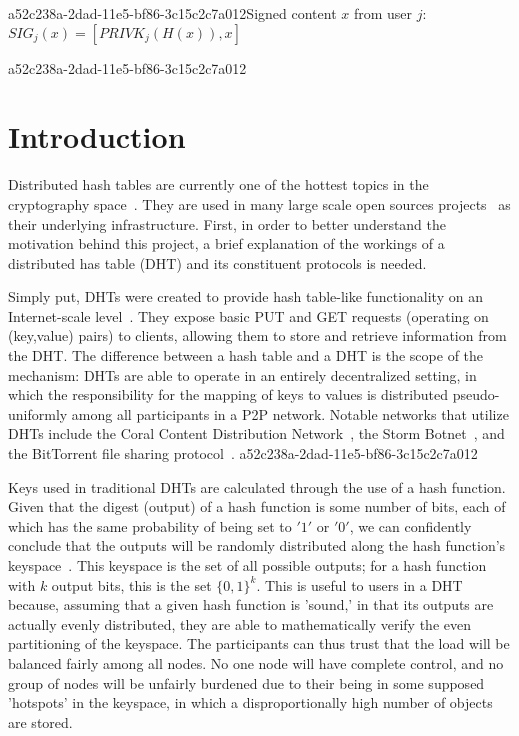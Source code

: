 \documentclass[12pt]{article}
\begin{document}
a52c238a-2dad-11e5-bf86-3c15c2c7a012Signed content $x$ from user $j$: $SIG_j(x) = \left[ PRIVK_j( H(x) ), x \right]$

a52c238a-2dad-11e5-bf86-3c15c2c7a012\section{Introduction}
\par Distributed hash tables are currently one of the hottest topics in the cryptography space~\cite{Stoica:2001dj,Rowstron:2001ea,Ratnasamy:2001wn}. They are used in many large scale open sources projects~\cite{Freitas:2013tb,Xu:2010vs,Perfitt:2010fh} as their underlying infrastructure. First, in order to better understand the motivation behind this project, a brief explanation of the workings of a distributed has table (DHT) and its constituent protocols is needed.

\par Simply put, DHTs were created to provide hash table-like functionality on an Internet-scale level~\cite{Ratnasamy:2001wn}. They expose basic PUT and GET requests (operating on (key,value) pairs) to clients, allowing them to store and retrieve information from the DHT. The difference between a hash table and a DHT is the scope of the mechanism: DHTs are able to operate in an entirely decentralized setting, in which the responsibility for the mapping of keys to values is distributed pseudo-uniformly among all participants in a P2P network. Notable networks that utilize DHTs include the Coral Content Distribution Network~\cite{Freedman:2004vb}, the Storm Botnet~\cite{Holz:2008uk}, and the BitTorrent file sharing protocol~\cite{Cohen:y1_8mBnw}.
a52c238a-2dad-11e5-bf86-3c15c2c7a012
\par Keys used in traditional DHTs are calculated through the use of a hash function. Given that the digest (output) of a hash function is some number of bits, each of which has the same probability of being set to $'1'$ or $'0'$, we can confidently conclude that the outputs will be randomly distributed along the hash function's keyspace~. This keyspace is the set of all possible outputs; for a hash function with $k$ output bits, this is the set $\{0,1\}^k$. This is useful to users in a DHT because, assuming that a given hash function is 'sound,' in that its outputs are actually evenly distributed, they are able to mathematically verify the even partitioning of the keyspace. The participants can thus trust that the load will be balanced fairly among all nodes. No one node will have complete control, and no group of nodes will be unfairly burdened due to their being in some supposed 'hotspots' in the keyspace, in which a disproportionally high number of objects are stored.~
\end{document}
